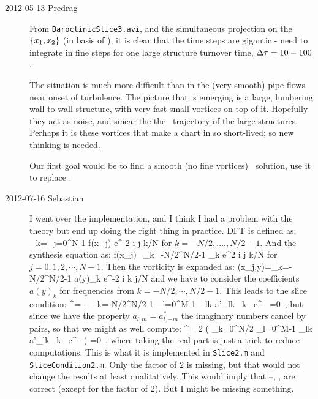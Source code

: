 \begin{description}
\item[2012-05-13  Predrag]
From \texttt{BaroclinicSlice3.avi}, and the simultaneous projection on the
$\{x_1, x_2\}$ (in basis of ), it is clear
that the time steps are gigantic - need to integrate in fine steps for
one large structure turnover time,
$\Delta\tau = 10-100$.

The situation is much more difficult than in the (very smooth) pipe flows
near onset of turbulence. The picture that is emerging is a large,
lumbering wall to wall structure, with very fast small vortices on top of
it. Hopefully they act as noise, and smear the the \statesp\ trajectory
of the large structures. Perhaps it is these vortices that make a chart
in  so short-lived; so new thinking is needed.

Our first goal would be to find a smooth (no fine vortices) \reqv\
solution, use it to replace .

\item[2012-07-16 Sebastian]
I went over the implementation, and I think I had a problem with the
theory but end up doing the right thing in practice. DFT is
defined as:
\beq
{}_k=\sum_{j=0}^{N-1} f(x_j) e^{-2 \pi i j k/N}
\ee{DFT1}
for $k=-N/2,....,N/2-1$. And the synthesis equation as:
\beq
f(x_j)=\sum_{k=-N/2}^{N/2-1} _k e^{2 \pi i j k/N}
for $j=0,1,2,\cdots,N-1$. Then the vorticity is expanded as:
    \beq
    \xi(x_j,y)=\sum_{k=-N/2}^{N/2-1} a(y)_{k} e^{-2 \pi i k j/N}
    \ee{fft1}
and we have to consider the coefficients $a(y)_k$ for frequencies from
$k=-N/2,\cdots,N/2-1$. This leads to the slice condition:
\beq
    \sspRed^\dagger \Lg \slicep=
    -\, \sum_{k=-N/2}^{N/2-1} \sum_{l=0}^{M-1}
    _{lk} a'_{lk} \, k \, e^{-\, \gSpace}
     =0
\,,
but since we have the property $a_{l,m}=a^*_{l,-m}$ the imaginary numbers
cancel by pairs, so that we might as well compute:
\beq
    \sspRed^\dagger \Lg \slicep=
    2 \cdot \Re\left( \sum_{k=0}^{N/2} \sum_{l=0}^{M-1}
    \overline{a}_{lk} a'_{lk} \, k \, e^{-\,\frac{2 \pi i k}{N} \gSpace}\right)
     =0
\,,
where taking the real part is just a trick to reduce computations. This
is what it is implemented  in \verb"Slice2.m" and
\verb"SliceCondition2.m". Only the factor of $2$ is missing, but that
would not change the results at least qualitatively. This would imply
that \refeq{min4_2}--\refeq{min6_3}, \refeq{dotProduct}, 
are correct (except for the factor of $2$). But I might be missing
something.


\end{description}
